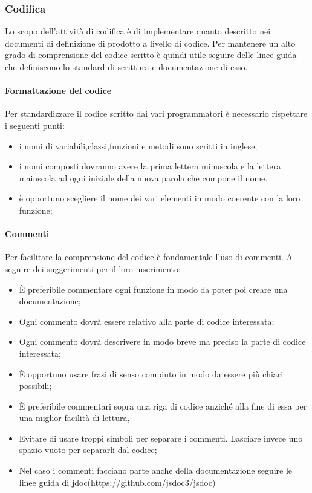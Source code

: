 	\subsubsection{Codifica}%
	Lo scopo dell'attività di codifica è di implementare quanto descritto nei documenti di definizione di prodotto a livello di codice. Per mantenere un alto grado di comprensione del codice scritto è quindi utile seguire delle linee guida che definiscono lo standard di scrittura e documentazione di esso.
		\paragraph{Formattazione del codice}
		Per standardizzare il codice scritto dai vari programmatori è necessario rispettare i seguenti punti:
			\begin{itemize}
				\item i nomi di variabili,classi,funzioni e metodi sono scritti in inglese;
				\item i nomi composti dovranno avere la prima lettera minuscola e la lettera maiuscola ad ogni iniziale della nuova parola che compone il nome.
				\item è opportuno scegliere il nome dei vari elementi in modo coerente con la loro funzione;
				
			\end{itemize}
		\paragraph{Commenti}
		Per facilitare la comprensione del codice è fondamentale l'uso di commenti. A seguire dei suggerimenti per il loro inserimento:
		\begin{itemize}
			\item È preferibile commentare ogni funzione in modo da poter poi creare una documentazione;
			\item Ogni commento dovrà essere relativo alla parte di codice interessata;
			\item Ogni commento dovrà descrivere in modo breve ma preciso la parte di codice interessata;
			\item È opportuno usare frasi di senso compiuto in modo da essere più chiari possibili;
			\item È preferibile commentari sopra una riga di codice anziché alla fine di essa per una miglior facilità di lettura,
			\item Evitare di usare troppi simboli per separare i commenti. Lasciare invece uno spazio vuoto per separarli dal codice;
			\item Nel caso i commenti facciano parte anche della documentazione seguire le linee guida di jdoc(https://github.com/jsdoc3/jsdoc) %
		\end{itemize}
